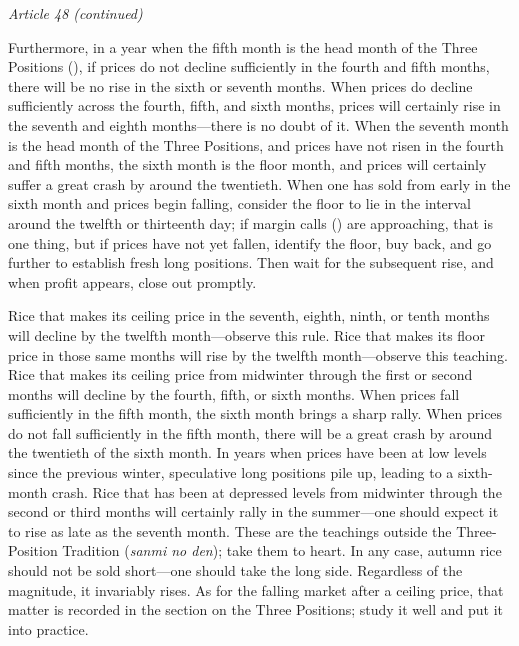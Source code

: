 \begin{sokyubox}
{\small\itshape\color{sokyubar} Article 48 (continued)}

\medskip
Furthermore, in a year when the fifth month is the head month of the
Three Positions (), if prices do not decline
sufficiently in the fourth and fifth months, there will be no rise in
the sixth or seventh months. When prices do decline sufficiently across
the fourth, fifth, and sixth months, prices will certainly rise in the
seventh and eighth months---there is no doubt of it. When the seventh
month is the head month of the Three Positions, and prices have not
risen in the fourth and fifth months, the sixth month is the floor
month, and prices will certainly suffer a great crash by around the
twentieth. When one has sold from early in the sixth month and prices
begin falling, consider the floor to lie in the interval around the
twelfth or thirteenth day; if margin calls () are
approaching, that is one thing, but if prices have not yet fallen,
identify the floor, buy back, and go further to establish fresh long
positions. Then wait for the subsequent rise, and when profit appears,
close out promptly.

Rice that makes its ceiling price in the seventh, eighth, ninth, or
tenth months will decline by the twelfth month---observe this rule. Rice
that makes its floor price in those same months will rise by the twelfth
month---observe this teaching. Rice that makes its ceiling price from
midwinter through the first or second months will decline by the fourth,
fifth, or sixth months. When prices fall sufficiently in the fifth
month, the sixth month brings a sharp rally. When prices do not fall
sufficiently in the fifth month, there will be a great crash by around
the twentieth of the sixth month. In years when prices have been at low
levels since the previous winter, speculative long positions pile up,
leading to a sixth-month crash. Rice that has been at depressed
levels from midwinter
through the second or third months will certainly rally in the
summer---one should expect it to rise as late as the seventh month.
These are the teachings outside the Three-Position Tradition
(\textit{sanmi no den}); take them to heart. In any case, autumn rice
should not be sold short---one should take the long side. Regardless of
the magnitude, it invariably rises. As for the falling market after a
ceiling price, that matter is recorded in the section on the Three
Positions; study it well and put it into practice.
\end{sokyubox}

